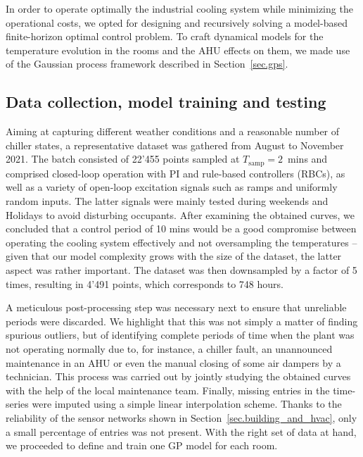 In order to operate optimally the industrial cooling system while minimizing the operational costs, we opted for designing and recursively solving a model-based finite-horizon optimal control problem. To craft dynamical models for the temperature evolution in the rooms and the AHU effects on them, we made use of the Gaussian process framework described in Section~\ref{sec.gps}.

\subsection{Data collection, model training and testing}
\label{sec.ModelTrainingAndTesting}

Aiming at capturing different weather conditions and a reasonable number of chiller states, a representative dataset was gathered from August to November 2021. The batch consisted of 22'455 points sampled at $T_\text{samp} = 2\,$ mins and comprised closed-loop operation with PI and rule-based controllers (RBCs), as well as a variety of open-loop excitation signals such as ramps and uniformly random inputs. The latter signals were mainly tested during weekends and Holidays to avoid disturbing occupants. After examining the obtained curves, we concluded that a control period of 10 mins would be a good compromise between operating the cooling system effectively and not oversampling the temperatures -- given that our model complexity grows with the size of the dataset, the latter aspect was rather important. The dataset was then downsampled by a factor of 5 times, resulting in 4'491 points, which corresponds to 748 hours. 

A meticulous post-processing step was necessary next to ensure that unreliable periods were discarded. We highlight that this was not simply a matter of finding spurious outliers, but of identifying complete periods of time when the plant was not operating normally due to, for instance, a chiller fault, an unannounced maintenance in an AHU or even the manual closing of some air dampers by a technician. This process was carried out by jointly studying the obtained curves with the help of the local maintenance team. Finally, missing entries in the time-series were imputed using a simple linear interpolation scheme. Thanks to the reliability of the sensor networks shown in Section~\ref{sec.building_and_hvac}, only a small percentage of entries was not present. With the right set of data at hand, we proceeded to define and train one GP model for each room. 

